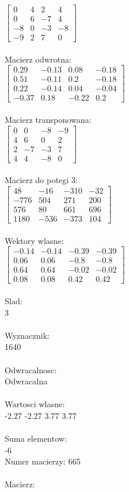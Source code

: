 \documentclass[a4paper,12pt]{article}
\begin{document}
$\begin{bmatrix} 0&4&2&4\\0&6&-7&4\\-8&0&-3&-8\\-9&2&7&0 \end{bmatrix}$
\\
\\
Macierz odwrotna:\\

$\begin{bmatrix} 0.29&-0.13&0.08&-0.18\\0.51&-0.11&0.2&-0.18\\0.22&-0.14&0.04&-0.04\\-0.37&0.18&-0.22&0.2 \end{bmatrix}$
\\
\\
Macierz transponowana:\\

$\begin{bmatrix} 0&0&-8&-9\\4&6&0&2\\2&-7&-3&7\\4&4&-8&0 \end{bmatrix}$
\\
\\
Macierz do potegi 3:\\

$\begin{bmatrix} 48&-16&-310&-32\\-776&504&271&200\\576&80&661&696\\1180&-536&-373&104 \end{bmatrix}$
\\
\\
Wektory wlasne:\\

$\begin{bmatrix} -0.14&-0.14&-0.39&-0.39\\0.06&0.06&-0.8&-0.8\\0.64&0.64&-0.02&-0.02\\0.08&0.08&0.42&0.42 \end{bmatrix}$
\\
\\
Slad:\\
3
\\
\\
Wyznacznik:\\
1640
\\
\\
Odwracalnosc:\\
Odwracalna
\\
\\
Wartosci wlasne:\\
-2.27 -2.27 3.77 3.77
\\
\\
Suma elementow:\\
-6
\\
\newpage
Numer macierzy:
665
\\
\\
Macierz:\\
\end{document}
